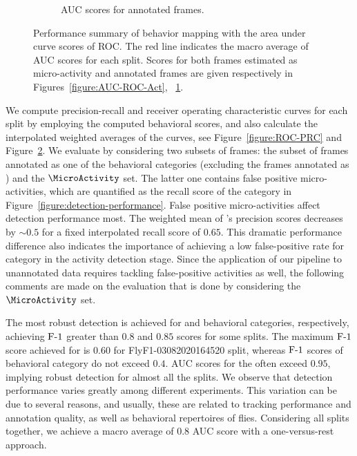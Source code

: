 \begin{figure}[htb!]
\begin{subfigure}[b]{0.5\linewidth}
		\caption{AUC scores for annotated frames. \label{figure:AUC-ROC-Ann}}
	\end{subfigure}%
	\caption[Performance summary of behavior mapping with the area under curve scores of ROC.]
	{Performance summary of behavior mapping with the area under curve scores of ROC.
		The red line indicates the macro average of AUC scores for each split.
		Scores for both frames estimated as micro-activity and annotated frames are given respectively in Figures~\ref{figure:AUC-ROC-Act}, ~\ref{figure:AUC-ROC-Ann}.
		\label{figure:AUC}}
\end{figure}

We compute precision-recall and receiver operating characteristic curves for each split by employing the computed behavioral scores, and also calculate the interpolated weighted averages of the curves, see Figure~\ref{figure:ROC-PRC} and Figure~\ref{figure:AUC}.
We evaluate by considering two subsets of frames: the subset of frames annotated as one of the behavioral categories (excluding the frames annotated as \QuiescentOther) and the $\MicroActivity$ set.
The latter one contains false positive micro-activities, which are quantified as the recall score of the \QuiescentOther category in Figure~\ref{figure:detection-performance}.
False positive micro-activities affect \HaltereSwitch detection performance most. The weighted mean of \HaltereSwitch's precision scores decreases by ${\sim}0.5$ for a fixed interpolated recall score of $0.65$.
This dramatic performance difference also indicates the importance of achieving a low false-positive rate for \QuiescentOther category in the activity detection stage.
Since the application of our pipeline to unannotated data requires tackling false-positive activities as well, the following comments are made on the evaluation that is done by considering the $\MicroActivity$ set.

The most robust detection is achieved for \ProboscisPumping and \PosturalAdjustment behavioral categories, respectively, achieving $\textnormal{F-}1$ greater than $0.8$ and $0.85$ scores for some splits.
The maximum $\textnormal{F-}1$ score achieved for \Grooming is $0.60$ for FlyF1-03082020164520 split, whereas $\textnormal{F-}1$ scores of \HaltereSwitch behavioral category do not exceed $0.4$.
AUC scores for the \ProboscisPumping often exceed $0.95$, implying robust detection for almost all the splits.
We observe that detection performance varies greatly among different experiments. This variation can be due to several reasons, and usually, these are related to tracking performance and annotation quality, as well as behavioral repertoires of flies.
Considering all splits together, we achieve a macro average of $0.8$ AUC score with a one-versus-rest approach.

